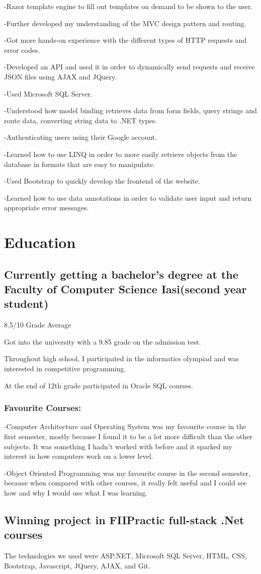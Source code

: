 \documentclass[a4paper,hidelinks,11pt]{article}
\begin{document}
-Razor template engine to fill out templates on demand to be shown to the user.

-Further developed my understanding of the MVC design pattern and routing.

-Got more hands-on experience with the different types of HTTP requests and error codes.

-Developed an API and used it in order to dynamically send requests and receive JSON files using AJAX and JQuery.

-Used Microsoft SQL Server.  

-Understood how model binding retrieves data from form fields, query strings and route data, converting string
data to .NET types.

-Authenticating users using their Google account.

-Learned how to use LINQ in order to more easily retrieve objects from the database in formats that are easy
to manipulate.

-Used Bootstrap to quickly develop the frontend of the website.

-Learned how to use data annotations in order to validate user input and return appropriate error messages.


\section{Education}
\subsection{Currently getting a bachelor's degree at 
the Faculty of Computer Science Iasi(second year student)}
 8.5/10 Grade Average

Got into the university with a 9.85 grade on the admission test.

Throughout high school, I participated in the informatics olympiad and was interested in competitive programming.

At the end of 12th grade participated in Oracle SQL courses.
 
 \subsubsection{Favourite Courses:} 
 -Computer Architecture and Operating System was my favourite course in the first semester, mostly because I 
 found it to be a lot more difficult than the other subjects. It was something I hadn't worked with before
 and it sparked my interest in how computers work on a lower level.

 -Object Oriented Programming was my favourite course in the second semester, because when compared
 with other courses, it really felt useful and I could see how and why I would use what I was learning.


\subsection{Winning project in FIIPractic full-stack .Net courses}

The technologies we used were ASP.NET, Microsoft SQL Server, HTML, CSS, Bootstrap, Javascript,
JQuery, AJAX, and Git. 
\end{document}
